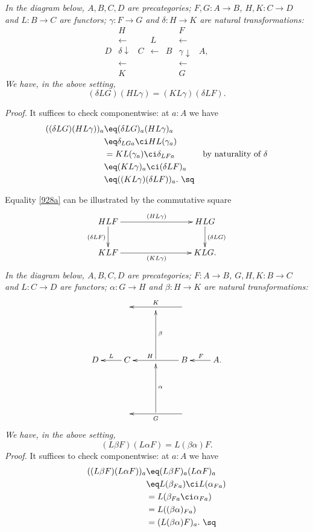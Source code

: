 \documentclass[12pt]{article}
\begin{document}
\nn{} \emph{In the diagram below, $A,B,C,D$ are precategories; $F,G:A\to B$, $H,K:C\to D$ and $L:B\to C$ are functors; $\gamma:F\to G$ and $\delta:H\to K$ are natural transformations:
$$
\begin{array}{ccccccc}
&H&&&&F\\
&\leftarrow&&L&&\leftarrow\\
D&\delta\downarrow&C&\leftarrow&B&\gamma\downarrow&A,\\
&\leftarrow&&&&\leftarrow\\
&K&&&&G
\end{array}
$$
We have, in the above setting,}
\begin{equation}\label{928a}
(\delta LG)(HL\gamma)=(KL\gamma)(\delta LF).
\end{equation}

\nn\emph{Proof.} It suffices to check componentwise: at $a:A$ we have
\begin{align*}
((\delta LG)(HL\gamma))_a
&\eq(\delta LG)_a(HL\gamma)_a\\
&\eq\delta_{LGa}\ci HL(\gamma_a)\\
&=KL(\gamma_a)\ci\delta_{LFa}&\text{by naturality of $\delta$}\\
&\eq(KL\gamma)_a\ci(\delta LF)_a\\
&\eq((KL\gamma)(\delta LF))_a.\ \sq
\end{align*}

Equality \eqref{928a} can be illustrated by the commutative square 
$$
\xymatrix{
HLF\ar[rrr]^{(HL\gamma)}\ar[d]_{(\delta LF)}&&&HLG\ar[d]^{(\delta LG)}\\ 
KLF\ar[rrr]_{(KL\gamma)}&&&KLG.}
$$ 
 \emph{In the diagram below, $A,B,C,D$ are precategories; $F:A\to B$, $G,H,K:B\to C$ and $L:C\to D$ are functors; $\alpha:G\to H$ and $\beta:H\to K$ are natural transformations:
$$
\xymatrix{
&&&\ar[ll]_K\\ \\
D&C\ar[l]_L&\ar[uu]_\beta&B\ar[ll]_(.6)H&A.\ar[l]_F\\ \\
&&\ar[uu]_\alpha&\ar[ll]^G}
$$ 
We have, in the above setting,}
\begin{equation}\label{928b}
(L\beta F)(L\alpha F)=L(\beta\alpha)F.
\end{equation}
\emph{Proof.} It suffices to check componentwise: at $a:A$ we have
\begin{align*}
((L\beta F)(L\alpha F))_a
&\eq(L\beta F)_a(L\alpha F)_a\\
&\eq L(\beta_{Fa})\ci L(\alpha_{Fa})\\
&=L(\beta_{Fa}\ci\alpha_{Fa})\\
&=L((\beta\alpha)_{Fa})\\ 
&=(L(\beta\alpha)F)_a.\ \sq
\end{align*}
\end{document}

